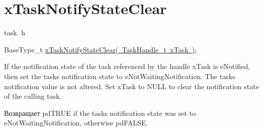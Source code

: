 \hypertarget{group__x_task_notify_state_clear}{}\section{x\+Task\+Notify\+State\+Clear}
\label{group__x_task_notify_state_clear}
task. h 
\begin{DoxyPre}BaseType\_t \mbox{\hyperlink{task_8h_a4cb6c908a9d2d733e9d519d7dc27bb34}{xTaskNotifyStateClear( TaskHandle\_t xTask )}};\end{DoxyPre}


If the notification state of the task referenced by the handle x\+Task is e\+Notified, then set the task\textquotesingle{}s notification state to e\+Not\+Waiting\+Notification. The task\textquotesingle{}s notification value is not altered. Set x\+Task to N\+U\+LL to clear the notification state of the calling task.

\begin{DoxyReturn}{Возвращает}
pd\+T\+R\+UE if the task\textquotesingle{}s notification state was set to e\+Not\+Waiting\+Notification, otherwise pd\+F\+A\+L\+SE. 
\end{DoxyReturn}
